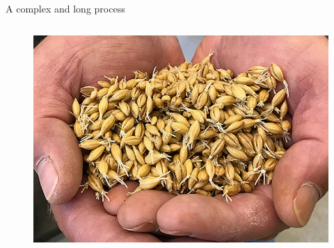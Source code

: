 \documentclass{beamer}
\begin{document}
	\begin{frame}{A complex and long process}
	\begin{columns}
		\begin{column}{0.4\textwidth}
			\begin{figure}[H]
				\begin{center}
					\includegraphics[scale = 0.15]{germ_barley}
					
				\end{center}
			
			\end{figure}
		\end{column}
	

\end{columns}
\end{frame}
\end{document}
